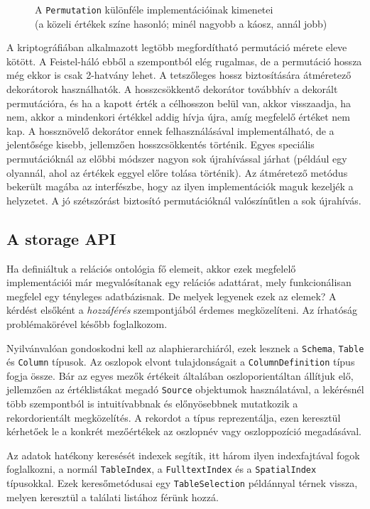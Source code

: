 \documentclass[
    parspace,
    noindent,
    nohyp,
]{elteiktdk}[2023/04/10]
\begin{document}
\begin{figure}[H]
  \caption[Permutációk kimeneteinek összehasonlítása]{
    A \texttt{Permutation} különféle implementációinak kimenetei \\
    (a közeli értékek színe hasonló; minél nagyobb a káosz, annál jobb)
  }
\end{figure}

A kriptográfiában alkalmazott legtöbb megfordítható permutáció mérete eleve kötött.
A Feistel-háló ebből a szempontból elég rugalmas,
de a permutáció hossza még ekkor is csak 2-hatvány lehet.
A tetszőleges hossz biztosítására átméretező dekorátorok használhatók.
A hosszcsökkentő dekorátor továbbhív a dekorált permutációra,
és ha a kapott érték a célhosszon belül van, akkor visszaadja, ha nem,
akkor a mindenkori értékkel addig hívja újra,
amíg megfelelő értéket nem kap.
A hossznövelő dekorátor ennek felhasználásával implementálható,
de a jelentősége kisebb, jellemzően hosszcsökkentés történik.
Egyes speciális permutációknál az előbbi módszer nagyon sok újrahívással járhat
(például egy olyannál, ahol az értékek eggyel előre tolása történik).
Az átméretező metódus bekerült magába az interfészbe,
hogy az ilyen implementációk maguk kezeljék a helyzetet.
A jó szétszórást biztosító permutációknál valószínűtlen a sok újrahívás.

\subsection{A storage API}

Ha definiáltuk a relációs ontológia fő elemeit,
akkor ezek megfelelő implementációi már megvalósítanak egy relációs adattárat,
mely funkcionálisan megfelel egy tényleges adatbázisnak.
De melyek legyenek ezek az elemek?
A kérdést elsőként a \textit{hozzáférés} szempontjából érdemes megközelíteni.
Az írhatóság problémakörével később foglalkozom.

Nyilvánvalóan gondoskodni kell az alaphierarchiáról,
ezek lesznek a \texttt{Schema}, \texttt{Table} és \texttt{Column} típusok.
Az oszlopok elvont tulajdonságait a \texttt{ColumnDefinition} típus fogja össze.
Bár az egyes mezők értékeit általában oszloporientáltan állítjuk elő,
jellemzően az értéklistákat megadó \texttt{Source} objektumok használatával,
a lekérésnél több szempontból is intuitívabbnak és előnyösebbnek mutatkozik
a rekordorientált megközelítés.
A rekordot a  típus reprezentálja,
ezen keresztül kérhetőek le a konkrét mezőértékek
az oszlopnév vagy oszloppozíció megadásával.

Az adatok hatékony keresését indexek segítik, itt három ilyen indexfajtával fogok foglalkozni,
a normál \texttt{TableIndex}, a \texttt{FulltextIndex} és a \texttt{SpatialIndex} típusokkal.
Ezek keresőmetódusai egy \texttt{TableSelection} példánnyal térnek vissza,
melyen keresztül a találati listához férünk hozzá.
\end{document}
